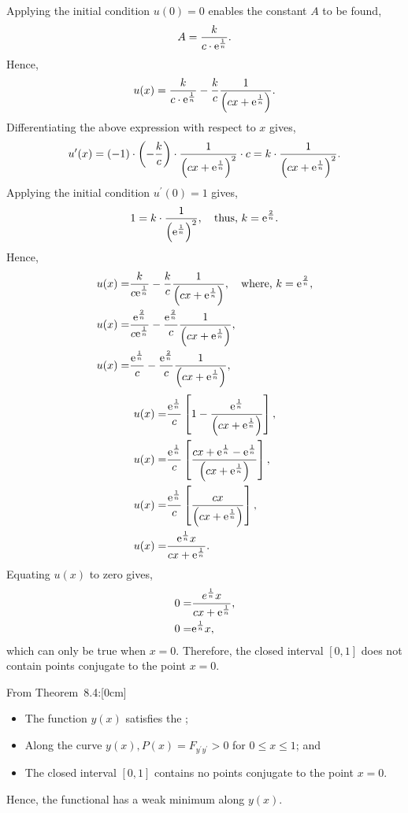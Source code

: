 Applying the initial condition $u(0) = 0$ enables the constant $A$ to be found,
\[
	A = \dfrac{k}{c\cdot\mathrm{e}^\frac{1}{n}}.
\]
Hence,
\[
	u(x) = \dfrac{k}{c\cdot\mathrm{e}^\frac{1}{n}} - \dfrac{k}{c}\dfrac{1}{\left(cx + \mathrm{e}^{\frac{1}{n}}\right)}.
\]
Differentiating the above expression with respect to $x$ gives,
\[
	u^\prime(x) = (-1)\cdot\left(-\frac{k}{c}\right)\cdot\frac{1}{\left(cx + \mathrm{e}^{\frac{1}{n}}\right)^2}\cdot c = k\cdot \frac{1}{\left(cx + \mathrm{e}^{\frac{1}{n}}\right)^2}.
\]
Applying the initial condition $u^\prime(0)=1$ gives,
\[
	1 = k\cdot \frac{1}{\left(\mathrm{e}^\frac{1}{n}\right)^2},\quad \textrm{thus, } k = \mathrm{e}^{\frac{2}{n}}.
\]
Hence,
\begin{align*}
	u(x) = & \frac{k}{c \mathrm{e}^{\frac{1}{n}}} - \frac{k}{c} \frac{1}{\left(cx + \mathrm{e}^{\frac{1}{n}}\right)},\quad\textrm{where, } k=\mathrm{e}^{\frac{2}{n}},\\
	u(x) = & \frac{\mathrm{e}^{\frac{2}{n}}}{c \mathrm{e}^{\frac{1}{n}}} - \frac{\mathrm{e}^{\frac{2}{n}}}{c} \frac{1}{\left(cx + \mathrm{e}^{\frac{1}{n}}\right)},\\
	u(x) = & \frac{\mathrm{e}^{\frac{1}{n}}}{c} - \frac{\mathrm{e}^{\frac{2}{n}}}{c} \frac{1}{\left(cx + \mathrm{e}^{\frac{1}{n}}\right)},
\end{align*}
\begin{align*}
	u(x) = & \frac{\mathrm{e}^{\frac{1}{n}}}{c}\left[1 - \frac{\mathrm{e}^{\frac{1}{n}}}{\left(cx + \mathrm{e}^{\frac{1}{n}}\right)}\right],\\
	u(x) = & \frac{\mathrm{e}^{\frac{1}{n}}}{c}\left[\frac{cx + \mathrm{e}^{\frac{1}{n}} - \mathrm{e}^{\frac{1}{n}}}{\left(cx + \mathrm{e}^\frac{1}{n}\right)}\right],\\
	u(x) = & \frac{\mathrm{e}^{\frac{1}{n}}}{c}\left[\frac{cx}{\left(cx + \mathrm{e}^\frac{1}{n}\right)}\right],\\
	u(x) = & \frac{\mathrm{e}^\frac{1}{n} x}{cx + \mathrm{e}^\frac{1}{n}}.
\end{align*}
Equating $u(x)$ to zero gives,
\begin{align*}
	0 =& \frac{e^\frac{1}{n} x}{cx + \mathrm{e}^\frac{1}{n}},\\
	0 =& \mathrm{e}^\frac{1}{n} x,
\end{align*}
which can only be true when $x=0$.  Therefore, the closed interval $[0,1]$ does not contain points conjugate to the point $x=0$. 

From Theorem~8.4:[0cm]
\begin{itemize}
  \item The function $y(x)$ satisfies the \el;
  \item Along the curve $y(x), P(x) = F_{y^\prime y^\prime} > 0$ for $0\leq x \leq 1$; and
  \item The closed interval $[0,1]$ contains no points conjugate to the point $x=0$.
\end{itemize}
Hence, the functional has a weak minimum along $y(x)$.
